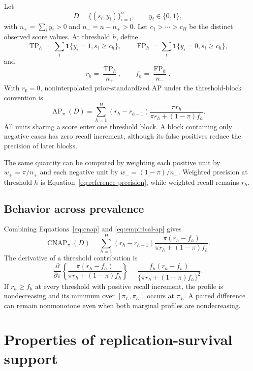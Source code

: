 \documentclass[11pt]{article}
\newcommand{\AP}{\operatorname{AP}}
\newcommand{\CNAP}{\operatorname{CNAP}}
\theoremstyle{remark}
\begin{document}
Let
\[
D=\{(s_i,y_i)\}_{i=1}^{n},
\qquad
y_i\in\{0,1\},
\]
with $n_+=\sum_i y_i>0$ and $n_-=n-n_+>0$. Let $c_1>\cdots>c_H$ be the distinct observed score values. At threshold $h$, define
\[
\operatorname{TP}_h
=
\sum_i\mathbf 1\{y_i=1,s_i\geq c_h\},
\qquad
\operatorname{FP}_h
=
\sum_i\mathbf 1\{y_i=0,s_i\geq c_h\},
\]
and
\[
r_h=\frac{\operatorname{TP}_h}{n_+},
\qquad
f_h=\frac{\operatorname{FP}_h}{n_-}.
\]
With $r_0=0$, noninterpolated prior-standardized AP under the threshold-block convention is
\begin{equation}
\AP_\pi(D)
=
\sum_{h=1}^{H}
(r_h-r_{h-1})
\frac{\pi r_h}
{\pi r_h+(1-\pi)f_h}.
\label{eq:empirical-ap}
\end{equation}
All units sharing a score enter one threshold block. A block containing only negative cases has zero recall increment, although its false positives reduce the precision of later blocks.

The same quantity can be computed by weighting each positive unit by $w_+=\pi/n_+$ and each negative unit by $w_-=(1-\pi)/n_-$. Weighted precision at threshold $h$ is Equation~\eqref{eq:reference-precision}, while weighted recall remains $r_h$.

\subsection{Behavior across prevalence}

Combining Equations~\eqref{eq:cnap} and \eqref{eq:empirical-ap} gives
\begin{equation}
\CNAP_\pi(D)
=
\sum_{h=1}^{H}
(r_h-r_{h-1})
\frac{\pi(r_h-f_h)}
{\pi r_h+(1-\pi)f_h}.
\label{eq:cnap-profile}
\end{equation}
The derivative of a threshold contribution is
\begin{equation}
\frac{\partial}{\partial\pi}
\left\{
\frac{\pi(r_h-f_h)}
{\pi r_h+(1-\pi)f_h}
\right\}
=
\frac{f_h(r_h-f_h)}
{\{\pi r_h+(1-\pi)f_h\}^2}.
\label{eq:cnap-derivative}
\end{equation}
If $r_h\geq f_h$ at every threshold with positive recall increment, the profile is nondecreasing and its minimum over $[\pi_L,\pi_U]$ occurs at $\pi_L$. A paired difference can remain nonmonotone even when both marginal profiles are nondecreasing.

\section{Properties of replication-survival support}
\label{app:support-proofs}
\end{document}
